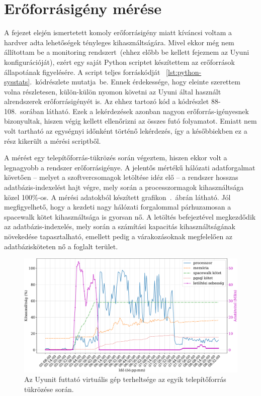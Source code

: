 \begin{figure}[htb]
	
\end{figure}

\section{Erőforrásigény mérése}
A fejezet elején ismertetett komoly erőforrásigény miatt kíváncsi voltam a hardver adta lehetőségek tényleges kihasználtságára. Mivel ekkor még nem állítottam be a monitoring rendszert~(ehhez előbb be kellett fejeznem az Uyuni konfigurációját), ezért egy saját Python scriptet készítettem az erőforrások állapotának figyelésére. A script teljes forráskódját ~\ref{lst:python-sysstats}.~kódrészlete mutatja~be. Ennek érdekessége, hogy eleinte szerettem volna részletesen, külön-külön nyomon követni az Uyuni által használt alrendszerek erőforrásigényét is. Az ehhez tartozó kód a kódrészlet 88-108.~sorában látható. Ezek a lekérdezések azonban nagyon erőforrás-igényesnek bizonyultak, hiszen végig kellett ellenőrizni az összes futó folyamatot. Emiatt nem volt tartható az egységnyi időnként történő lekérdezés, így a későbbiekben ez a rész kikerült a mérési scriptből.

A mérést egy telepítőforrás-tükrözés során végeztem, hiszen ekkor volt a legnagyobb a rendszer erőforrásigénye. A jelentős mértékű hálózati adatforgalmat követően -- melyet a szoftvercsomagok letöltése idéz elő -- a rendszer hosszas adatbázis-indexelést hajt végre, mely során a processzormagok kihasználtsága közel 100\%-os. A mérési adatokból készített grafikon~.~ábrán látható. Jól megfigyelhető, hogy a kezdeti nagy hálózati forgalommal párhuzamosan a spacewalk kötet kihasználtsága is gyorsan nő. A letöltés befejeztével megkezdődik az adatbázis-indexelés, mely során a számítási kapacitás kihasználtságának növekedése tapasztalható, emellett pedig a várakozásoknak megfelelően az adatbázisköteten nő a foglalt terület.


\begin{figure}[ht]
	\centering
	\includegraphics[width=15cm]{figures/reposync-leap-oss-grid.pdf}
	\caption{Az Uyunit futtató virtuális gép terheltsége az egyik telepítőforrás tükrözése során.}
	\label{fig:reposync-chart}
\end{figure}

